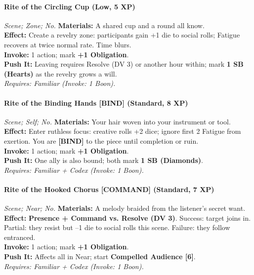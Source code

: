 \paragraph*{Rite of the Circling Cup (Low, 5 XP)} \emph{Scene; Zone; No.}
\textbf{Materials:} A shared cup and a round all know.\\
\textbf{Effect:} Create a revelry zone: participants gain +1 die to social rolls; Fatigue recovers at twice normal rate. Time blurs.\\
\textbf{Invoke:} 1 action; mark \textbf{+1 Obligation}.\\
\textbf{Push It:} Leaving requires Resolve (DV 3) or another hour within; mark \textbf{1 SB (Hearts)} as the revelry grows a will.\\
\emph{Requires: Familiar (\textit{Invoke:} 1 Boon).}

\paragraph{Rite of the Binding Hands [BIND] (Standard, 8 XP)} \emph{Scene; Self; No.}
\textbf{Materials:} Your hair woven into your instrument or tool.\\
\textbf{Effect:} Enter ruthless focus: creative rolls +2 dice; ignore first 2 Fatigue from exertion. You are \textbf{[BIND]} to the piece until completion or ruin.\\
\textbf{Invoke:} 1 action; mark \textbf{+1 Obligation}.\\
\textbf{Push It:} One ally is also bound; both mark \textbf{1 SB (Diamonds)}.\\
\emph{Requires: Familiar + Codex (\textit{Invoke:} 1 Boon).}

\paragraph{Rite of the Hooked Chorus [COMMAND] (Standard, 7 XP)} \emph{Scene; Near; No.}
\textbf{Materials:} A melody braided from the listener’s secret want.\\
\textbf{Effect:} \textbf{Presence + Command vs. Resolve (DV 3)}. Success: target joins in. Partial: they resist but --1 die to social rolls this scene. Failure: they follow entranced.\\
\textbf{Invoke:} 1 action; mark \textbf{+1 Obligation}.\\
\textbf{Push It:} Affects all in Near; start \textbf{Compelled Audience [6]}.\\
\emph{Requires: Familiar + Codex (\textit{Invoke:} 1 Boon).}

